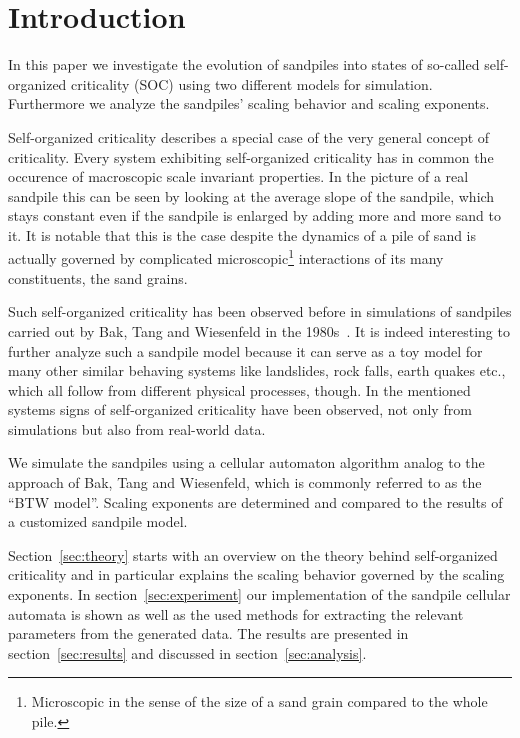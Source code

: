 \begin{abstract}
\dots
\end{abstract}

\maketitle

\section{Introduction}
\label{sec:intro}
In this paper we investigate the evolution of sandpiles into states of so-called self-organized criticality (SOC) using
two different models for simulation. Furthermore we analyze the sandpiles' scaling behavior and scaling exponents.

Self-organized criticality describes a special case of the very general concept of criticality. Every system
exhibiting self-organized criticality has in common the occurence of macroscopic scale invariant properties.
In the picture of a real sandpile this can be seen by looking at the average slope of the sandpile,
which stays constant even if the sandpile is enlarged by adding more and more sand to it.
It is notable that this is the case despite the dynamics of a pile of sand is actually governed by complicated
microscopic\footnote{Microscopic in the sense of the size of a sand grain compared to the whole pile.} interactions
of its many constituents, the sand grains.

Such self-organized criticality has been observed before in simulations of sandpiles carried out by Bak, Tang and
Wiesenfeld in the 1980s~\cite{BakTangWiesenfeld}. It is indeed interesting to further analyze such a sandpile model
because it can serve as a toy model for many other similar behaving systems like landslides, rock falls, earth quakes
etc., which all follow from different physical processes, though.
In the mentioned systems signs of self-organized criticality have been observed, not only from simulations but also
from real-world data. %

We simulate the sandpiles using a cellular automaton algorithm analog to the approach of Bak, Tang and Wiesenfeld,
which is commonly referred to as the \enquote{BTW model}. Scaling exponents are determined and compared to the
results of a customized sandpile model.

Section~\ref{sec:theory} starts with an overview on the theory behind self-organized criticality and in particular
explains the scaling behavior governed by the scaling exponents.
In section~\ref{sec:experiment} our implementation of the sandpile cellular automata is shown as well as
the used methods for extracting the relevant parameters from the generated data.
The results are presented in section~\ref{sec:results} and discussed in section~\ref{sec:analysis}.


